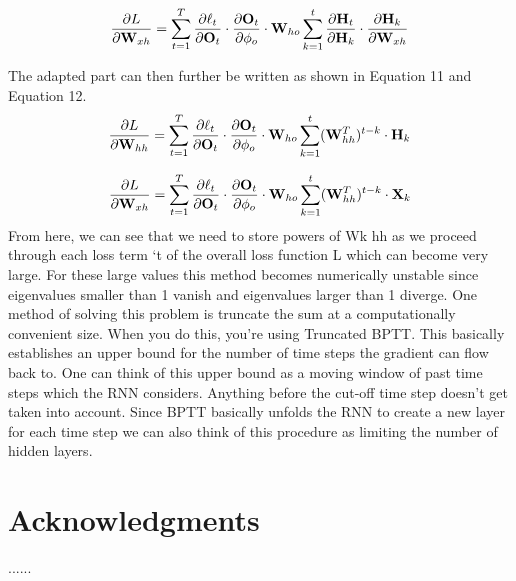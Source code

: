 \documentclass{article}
\begin{document}
\begin{equation}
  \pdv{L}{\mathbf{W}_{xh}} = \sum_{t=1}^T \pdv{\ell_t}{\mathbf{O}_t} \cdot \pdv{\mathbf{O}_t}{\phi_o} \cdot \mathbf{W}_{ho} \sum_{k=1}^t \pdv{\mathbf{H}_t}{\mathbf{H}_k} \cdot \pdv{\mathbf{H}_k}{\mathbf{W}_{xh}}
\end{equation}

The adapted part can then further be written as shown in Equation 11 and Equation 12.
\begin{equation}
  \pdv{L}{\mathbf{W}_{hh}} = \sum_{t=1}^T \pdv{\ell_t}{\mathbf{O}_t} \cdot \pdv{\mathbf{O}_t}{\phi_o} \cdot \mathbf{W}_{ho} \sum_{k=1}^t (\mathbf{W}_{hh}^T)^{t-k} \cdot \mathbf{H}_k
\end{equation}

\begin{equation}
  \pdv{L}{\mathbf{W}_{xh}} = \sum_{t=1}^T \pdv{\ell_t}{\mathbf{O}_t} \cdot \pdv{\mathbf{O}_t}{\phi_o} \cdot \mathbf{W}_{ho} \sum_{k=1}^t (\mathbf{W}_{hh}^T)^{t-k} \cdot \mathbf{X}_k
\end{equation}
From here, we can see that we need to store powers of Wk
hh as we proceed through each loss term
`t of the overall loss function L which can become very large. For these large values this method
becomes numerically unstable since eigenvalues smaller than 1 vanish and eigenvalues larger than 1
diverge. One method of solving this problem is truncate the sum at a computationally convenient
size. When you do this, you're using Truncated BPTT. This basically establishes an upper
bound for the number of time steps the gradient can flow back to. One can think of this upper
bound as a moving window of past time steps which the RNN considers. Anything before the cut-off
time step doesn't get taken into account. Since BPTT basically unfolds the RNN to create a new layer
for each time step we can also think of this procedure as limiting the number of hidden layers.


\section*{Acknowledgments}
......
\end{document}
